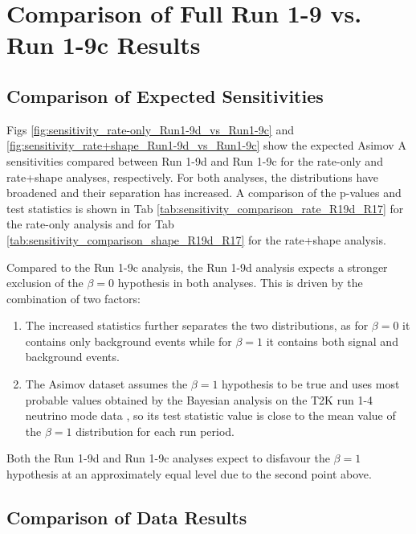 
{\color{red} 

\section{Comparison of Full Run 1-9 vs. Run 1-9c Results}\label{app:compare_R1-9d_R1-9c}

\subsection{Comparison of Expected Sensitivities}\label{app:compare_sensitivity}

Figs \ref{fig:sensitivity_rate-only_Run1-9d_vs_Run1-9c} and \ref{fig:sensitivity_rate+shape_Run1-9d_vs_Run1-9c} show the expected Asimov A sensitivities compared between Run 1-9d and Run 1-9c for the rate-only and rate+shape analyses, respectively. For both analyses, the distributions have broadened and their separation has increased. A comparison of the p-values and test statistics is shown in Tab \ref{tab:sensitivity_comparison_rate_R19d_R17} for the rate-only analysis and for Tab \ref{tab:sensitivity_comparison_shape_R19d_R17} for the rate+shape analysis.

Compared to the Run 1-9c analysis, the Run 1-9d analysis expects a stronger exclusion of the $\beta=0$ hypothesis in both analyses. This is driven by the combination of two factors: 
\begin{enumerate}
	\item The increased statistics further separates the two distributions, as for $\beta=0$ it contains only background events while for $\beta=1$ it contains both signal and background events.
	
	\item The Asimov dataset assumes the $\beta=1$ hypothesis to be true and uses most probable values obtained by the Bayesian analysis on the T2K run 1-4 neutrino mode data \cite{T2KLongPaper}, so its test statistic value is close to the mean value of the $\beta=1$ distribution for each run period.
\end{enumerate}

Both the Run 1-9d and Run 1-9c analyses expect to disfavour the $\beta=1$ hypothesis at an approximately equal level due to the second point above. 


\subsection{Comparison of Data Results} \label{app:compare_data}

}

